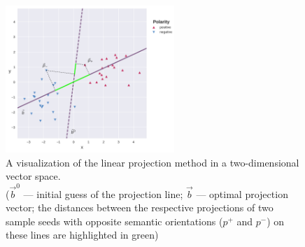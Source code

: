 
\begin{figure}
  \centering
  \mbox{\includegraphics[height=15em]{img/sentilex_L_M}}
  \caption[A visualization of the linear projection method in a
  two-dimensional vector space.]{A visualization of the linear
    projection method in a
    two-dimensional vector space.\\
    (\small$\vec{b}^0$ --- initial guess of the projection line;
    $\vec{b}$ --- optimal projection vector; the distances between the
    respective projections of two sample seeds with opposite semantic
    orientations ($p^+$ and $p^-$) on these lines are highlighted in
    \textcolor{highlighter green}{green})}
  \label{fig:linproj.L.M}
\end{figure}

